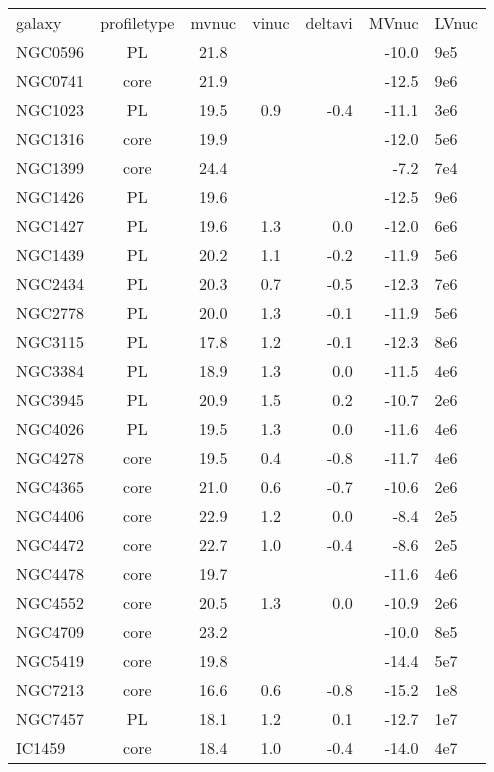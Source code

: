 \begin{tabular}{lcccrrl}
galaxy & profiletype & mvnuc & vinuc & deltavi & MVnuc & LVnuc \\
NGC0596 & PL &   21.8&     &     & -10.0& 9e5  \\
NGC0741 & core &   21.9&     &     & -12.5& 9e6  \\
NGC1023 & PL &   19.5&   0.9&  -0.4& -11.1& 3e6  \\
NGC1316 & core &   19.9&     &     & -12.0& 5e6  \\
NGC1399 & core &   24.4&     &     &  -7.2& 7e4  \\
NGC1426 & PL &   19.6&     &     & -12.5& 9e6  \\
NGC1427 & PL &   19.6&   1.3&   0.0& -12.0& 6e6  \\
NGC1439 & PL &   20.2&   1.1&  -0.2& -11.9& 5e6  \\
NGC2434 & PL &   20.3&   0.7&  -0.5& -12.3& 7e6  \\
NGC2778 & PL &   20.0&   1.3&  -0.1& -11.9& 5e6  \\
NGC3115 & PL &   17.8&   1.2&  -0.1& -12.3& 8e6  \\
NGC3384 & PL &   18.9&   1.3&   0.0& -11.5& 4e6  \\
NGC3945 & PL &   20.9&   1.5&   0.2& -10.7& 2e6  \\
NGC4026 & PL &   19.5&   1.3&   0.0& -11.6& 4e6  \\
NGC4278 & core &   19.5&   0.4&  -0.8& -11.7& 4e6  \\
NGC4365 & core &   21.0&   0.6&  -0.7& -10.6& 2e6  \\
NGC4406 & core &   22.9&   1.2&   0.0&  -8.4& 2e5  \\
NGC4472 & core &   22.7&   1.0&  -0.4&  -8.6& 2e5  \\
NGC4478 & core &   19.7&     &     & -11.6& 4e6  \\
NGC4552 & core &   20.5&   1.3&   0.0& -10.9& 2e6  \\
NGC4709 & core &   23.2&     &     & -10.0& 8e5  \\
NGC5419 & core &   19.8&     &     & -14.4& 5e7  \\
NGC7213 & core &   16.6&   0.6&  -0.8& -15.2& 1e8  \\
NGC7457 & PL &   18.1&   1.2&   0.1& -12.7& 1e7  \\
 IC1459 & core &   18.4&   1.0&  -0.4& -14.0& 4e7  \\
\end{tabular}
